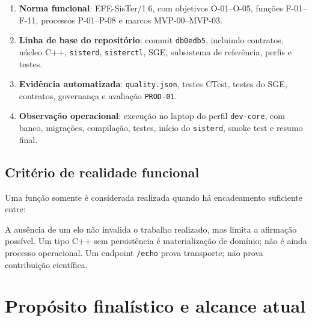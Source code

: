 \documentclass[11pt,a4paper,oneside]{article}
\begin{document}
\begin{enumerate}
  \item \textbf{Norma funcional}: EFE-SisTer/1.6, com objetivos O-01--O-05, funções F-01--F-11, processos P-01--P-08 e marcos MVP-00--MVP-03.
  \item \textbf{Linha de base do repositório}: commit \texttt{db0edb5}, incluindo contratos, núcleo C++, \texttt{sisterd}, \texttt{sisterctl}, SGE, subsistema de referência, perfis e testes.
  \item \textbf{Evidência automatizada}: \texttt{quality.json}, testes CTest, testes do SGE, contratos, governança e avaliação \texttt{PROD-01}.
  \item \textbf{Observação operacional}: execução no laptop do perfil \texttt{dev-core}, com banco, migrações, compilação, testes, início do \texttt{sisterd}, smoke test e resumo final.
\end{enumerate}

\subsection{Critério de realidade funcional}

Uma função somente é considerada realizada quando há encadeamento suficiente entre:

\begin{center}
\end{center}

A ausência de um elo não invalida o trabalho realizado, mas limita a afirmação possível. Um tipo C++ sem persistência é materialização de domínio; não é ainda processo operacional. Um endpoint \texttt{/echo} prova transporte; não prova contribuição científica.

\section{Propósito finalístico e alcance atual}
\end{document}
